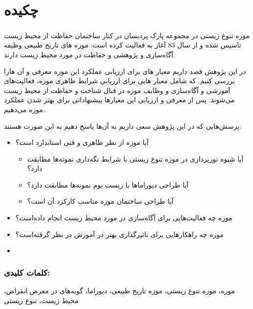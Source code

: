 
\chapter*{چکیده}

\paragraph*{}
موزه تنوع زیستی در مجموعه پارک پردیسان در کنار ساختمان حفاظت از محیط زیست تاسیس شده و از سال 83 آغاز به فعالیت کرده است.
موزه های تاریخ طبیعی وظیفه آگاه‌سازی و پژوهشی و حفاظت در مورد محیط زیست دارند.


در این پژوهش قصد داریم معیار های برای ارزیابی عملکرد این موزه معرفی و آن هارا بررسی کنیم.
که شامل معیار هایی برای ارزیابی شرایط ظاهری موزه، فعالیت‌های آموزشی و آگاه‌سازی و وظایف موزه در قبال شناخت و حفاظت از محیط زیست می‌شوند.
پس از معرفی و ارزیابی این معیارها پیشنهاداتی برای بهتر شدن عملکرد موزه می‌دهیم.

پرسش‌هایی که در این پژوهش سعی داریم به آن‌ها پاسخ دهیم به این صورت هستند:
\begin{itemize}
    \item آیا موزه از نظر ظاهری و فنی استاندارد است؟
    \begin{itemize}
        \item آیا شیوه نورپردازی در موزه تنوع زیستی با شرایط نگه‌داری نمونه‌ها مطابقت دارد؟
        \item آیا طراحی دیوراماها با زیست بوم نمونه‌ها مطابقت دارد؟
        \item آیا طراحی ساختمان موزه مناسب کارکرد آن است؟
    \end{itemize}
    \item موزه چه فعالیت‌هایی برای آگاه‌سازی در مورد محیط زیست انجام داده‌است؟
    \item موزه چه راهکارهایی برای تاثیرگذاری بهتر در آموزش در نظر گرفته‌است؟
    \item 
\end{itemize}

\subsection*{کلمات کلیدی:}
موزه، موزه تنوع زیستی، موزه تاریخ طبیعی، دیوراما، گونه‌های در معرض انقراض، محیط زیست، تنوع زیستی

